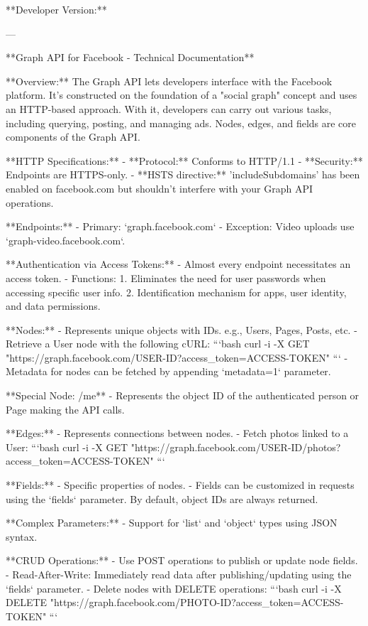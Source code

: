 **Developer Version:**

---

**Graph API for Facebook - Technical Documentation**

**Overview:**
The Graph API lets developers interface with the Facebook platform. It's constructed on the foundation of a "social graph" concept and uses an HTTP-based approach. With it, developers can carry out various tasks, including querying, posting, and managing ads. Nodes, edges, and fields are core components of the Graph API.

**HTTP Specifications:**
- **Protocol:** Conforms to HTTP/1.1
- **Security:** Endpoints are HTTPS-only. 
- **HSTS directive:** 'includeSubdomains' has been enabled on facebook.com but shouldn’t interfere with your Graph API operations.

**Endpoints:**
- Primary: `graph.facebook.com`
- Exception: Video uploads use `graph-video.facebook.com`.

**Authentication via Access Tokens:**
- Almost every endpoint necessitates an access token.
- Functions:
  1. Eliminates the need for user passwords when accessing specific user info.
  2. Identification mechanism for apps, user identity, and data permissions.

**Nodes:**
- Represents unique objects with IDs. e.g., Users, Pages, Posts, etc.
- Retrieve a User node with the following cURL:
```bash
curl -i -X GET "https://graph.facebook.com/USER-ID?access_token=ACCESS-TOKEN"
```
- Metadata for nodes can be fetched by appending `metadata=1` parameter.

**Special Node: /me**
- Represents the object ID of the authenticated person or Page making the API calls.
  
**Edges:**
- Represents connections between nodes.
- Fetch photos linked to a User:
```bash
curl -i -X GET "https://graph.facebook.com/USER-ID/photos?access_token=ACCESS-TOKEN"
```

**Fields:**
- Specific properties of nodes.
- Fields can be customized in requests using the `fields` parameter. By default, object IDs are always returned.
  
**Complex Parameters:**
- Support for `list` and `object` types using JSON syntax.

**CRUD Operations:**
- Use POST operations to publish or update node fields.
- Read-After-Write: Immediately read data after publishing/updating using the `fields` parameter.
- Delete nodes with DELETE operations:
```bash
curl -i -X DELETE "https://graph.facebook.com/PHOTO-ID?access_token=ACCESS-TOKEN"
```

